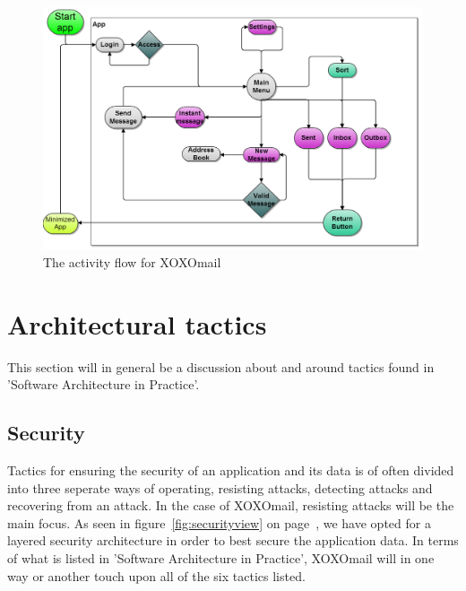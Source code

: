 \begin{figure}[h!]
	\includegraphics[width=\textwidth]{activities_flowchart3}
	\caption{The activity flow for XOXOmail}
	\label{fig:logicalGUIview}
\end{figure}



\newpage

\section{Architectural tactics}
	This section will in general be a discussion about and around tactics found in 'Software Architecture in Practice'\cite{bib:archi}. 
	\subsection{Security}
		Tactics for ensuring the security of an application and its data is of often divided into three seperate ways of operating, resisting attacks, detecting attacks and recovering from an attack. 
		In the case of XOXOmail, resisting attacks will be the main focus. As seen in figure~\ref{fig:securityview} on page~\pageref{fig:securityview}, we have opted for a layered security architecture in order to best secure the application data. In terms of what is listed in 'Software Architecture in Practice'\cite[p. 119]{bib:archi}, XOXOmail will in one way or another touch upon all of the six tactics listed. 

